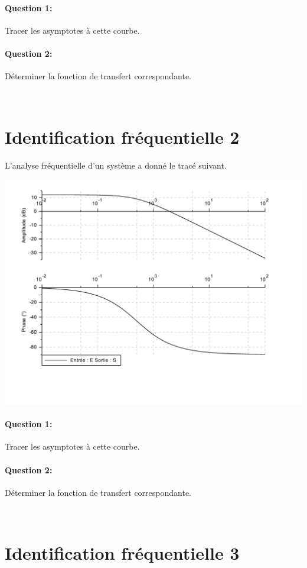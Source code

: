 \paragraph{Question 1:} Tracer les asymptotes à cette courbe.

\paragraph{Question 2:} Déterminer la fonction de transfert correspondante.

\newpage ~\ \newpage

\section{Identification fréquentielle 2}

L'analyse fréquentielle d'un système a donné le tracé suivant.

\begin{center}
 \includegraphics[width=0.8\linewidth]{img/Bode2}
\end{center} 

\paragraph{Question 1:} Tracer les asymptotes à cette courbe.

\paragraph{Question 2:} Déterminer la fonction de transfert correspondante.

\newpage ~\ \newpage

\section{Identification fréquentielle 3}

